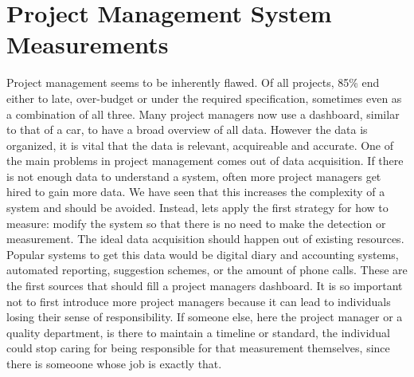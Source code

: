 \section{Project Management System Measurements}

Project management seems to be inherently flawed.
Of all projects, 85\% end either to late, over-budget or under the required specification, sometimes even as a combination of all three.
Many project managers now use a dashboard, similar to that of a car, to have a broad overview of all data.
However the data is organized, it is vital that the data is relevant, acquireable and accurate.
One of the main problems in project management comes out of data acquisition.
If there is not enough data to understand a system, often more project managers get hired to gain more data.
We have seen that this increases the complexity of a system and should be avoided.
Instead, lets apply the first strategy for how to measure: modify the system so that there is no need to make the detection or measurement.
The ideal data acquisition should happen out of existing resources.
Popular systems to get this data would be digital diary and accounting systems, automated reporting, suggestion schemes, or the amount of phone calls.
These are the first sources that should fill a project managers dashboard.
It is so important not to first introduce more project managers because it can lead to individuals losing their sense of responsibility.
If someone else, here the project manager or a quality department, is there to maintain a timeline or standard, the individual could stop caring for being responsible for that measurement themselves, since there is someoone whose job is exactly that.



















